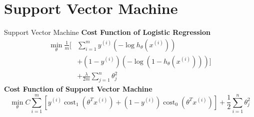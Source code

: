 \documentclass[9pt,dvipsnames]{beamer}
\begin{document}
\section{Support Vector Machine}
\begin{frame}{Support Vector Machine}
	\textbf{Cost Function of Logistic Regression}
	\begin{align*}
		\min _\theta \frac{1}{m}\Bigg[ & \sum_{i=1}^m y^{(i)}\left(-\log h_\theta\left(x^{(i)}\right)\right)\\
		                               & + \left(1-y^{(i)}\right)\left(-\log \left(1-h_\theta\left(x^{(i)}\right)\right)\right)\Bigg] \\
		                               & + \frac{\lambda}{2 m} \sum_{j=1}^n \theta_j^2
	\end{align*}
	\textbf{Cost Function of Support Vector Machine}
	$$
		\min _\theta C \sum_{i=1}^m\left[y^{(i)} \operatorname{cost}_1\left(\theta^T x^{(i)}\right)+\left(1-y^{(i)}\right) \operatorname{cost}_0\left(\theta^T x^{(i)}\right)\right]+\frac{1}{2} \sum_{i=1}^n \theta_j^2
	$$
\end{frame}
\end{document}
